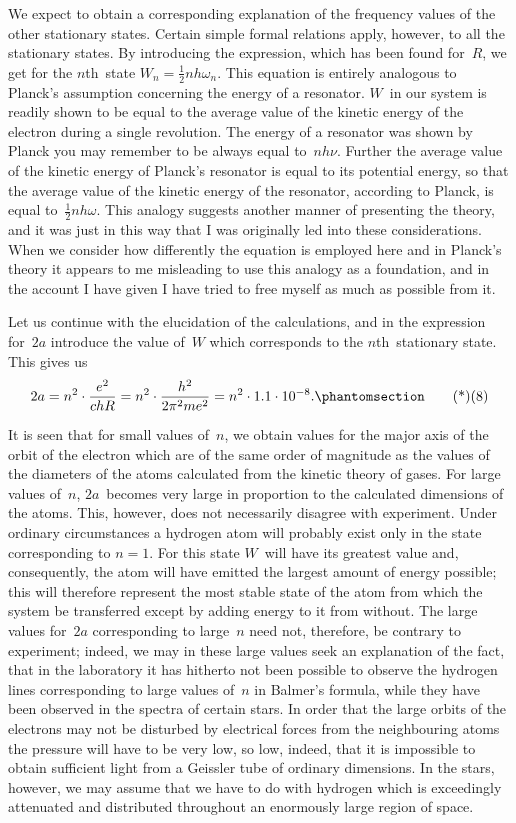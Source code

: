 We  expect to obtain a corresponding explanation of the
frequency values of the other stationary states. Certain simple
formal relations apply, however, to all the stationary states. By
introducing the expression, which has been found for~$R$, we
get for the $n$th~state $W_{n} = \frac{1}{2}nh\omega_{n}$. This equation is entirely
analogous to Planck's assumption concerning the energy of a
resonator. $W$~in our system is readily shown to be equal to the
average value of the kinetic energy of the electron during a
single revolution. The energy of a resonator was shown by Planck
you may remember to be always equal to~$nh\nu$. Further the average
value of the kinetic energy of Planck's resonator is equal to its
potential energy, so that the average value of the kinetic energy
of the resonator, according to Planck, is equal to~$\frac{1}{2}nh\omega$. This
analogy suggests another manner of presenting the theory, and it
was just in this way that I was originally led into these considerations.
When we consider how differently the equation is
employed here and in Planck's theory it appears to me misleading
to use this analogy as a foundation, and in the account I have
given I have tried to free myself as much as possible from it.

Let us continue with the elucidation of the calculations, and in
the expression for~$2a$ introduce the value of~$W$ which corresponds
to the $n$th~stationary state. This gives us
\[
2a = n^{2} \cdot \frac{e^{2}}{chR}
   = n^{2} \cdot \frac{h^{2}}{2\pi^{2} me^{2}}
   = n^{2} \cdot 1.1 \cdot 10^{-8}.
\Tag{(8)}
\]

It is seen that for small values of~$n$, we obtain values for the
major axis of the orbit of the electron which are of the same
order of magnitude as the values of the diameters of the atoms
calculated from the kinetic theory of gases. For large values of~$n$,
$2a$~becomes very large in proportion to the calculated dimensions
of the atoms. This, however, does not necessarily disagree with
experiment. Under ordinary circumstances a hydrogen atom will
probably exist only in the state corresponding to $n = 1$. For this
state $W$~will have its greatest value and, consequently, the atom
will have emitted the largest amount of energy possible; this will
therefore represent the most stable state of the atom from which
the system  be transferred except by adding energy to it
from without. The large values for~$2a$ corresponding to large~$n$ need
not, therefore, be contrary to experiment; indeed, we may in these
large values seek an explanation of the fact, that in the laboratory
it has hitherto not been possible to observe the hydrogen lines
corresponding to large values of~$n$ in Balmer's formula, while they
have been observed in the spectra of certain stars. In order that
the large orbits of the electrons may not be disturbed by electrical
forces from the neighbouring atoms the pressure will have to be
very low, so low, indeed, that it is impossible to obtain sufficient
light from a Geissler tube of ordinary dimensions. In the stars,
however, we may assume that we have to do with hydrogen which
is exceedingly attenuated and distributed throughout an enormously
large region of space.

